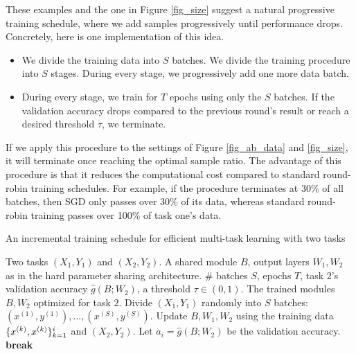 These examples and the one in Figure \ref{fig_size} suggest a natural progressive training schedule, where we add samples progressively until performance drops.
Concretely, here is one implementation of this idea.
\begin{itemize}
	\item We divide the training data into $S$ batches.
	We divide the training procedure into $S$ stages. During every stage, we progressively add one more data batch.
	\item During every stage, we train for $T$ epochs using only the $S$ batches. If the validation accuracy drops compared to the previous round's result or reach a desired threshold $\tau$, we terminate.
\end{itemize}
If we apply this procedure to the settings of Figure \ref{fig_ab_data} and \ref{fig_size}, it will terminate once reaching the optimal sample ratio.
The advantage of this procedure is that it reduces the computational cost compared to standard round-robin training schedules.
For example, if the procedure terminates at 30\% of all batches, then SGD only passes over 30\% of its data, whereas standard round-robin training passes over 100\% of task one's data.

\begin{algorithm}[!t]
	\caption{An incremental training schedule for efficient multi-task learning with two tasks}
	\label{alg_inc_train}
	\begin{algorithmic}[1]
		\Input Two tasks $(X_1, Y_1)$ and $(X_2, Y_2)$.
		\Param A shared module $B$, output layers $W_1, W_2$ as in the hard parameter sharing architecture.
		\Req \# batches $S$, epochs $T$, task $2$'s validation accuracy $\hat{g}(B; W_2)$, a threshold $\tau\in(0,1)$.
		\Output The trained modules $B, W_2$ optimized for task $2$.
		\State Divide $(X_1, Y_1)$ randomly into $S$ batches: $(x^{(1)}, y^{(1)}), \dots, (x^{(S)}, y^{(S)})$.
		\State Update $B, W_1, W_2$ using the training data $\{x^{(k)}, x^{(k)}\}_{k=1}^i$ and  $(X_2, Y_2)$.
		\EndFor
		\State Let $a_i = \hat{g}(B; W_2)$ be the validation accuracy.
		\State \textbf{break}
		\EndIf
		\EndFor
	\end{algorithmic}
\end{algorithm}

